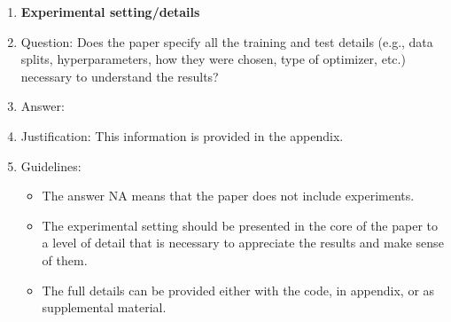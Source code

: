 \documentclass{article}
\theoremstyle{plain}
\theoremstyle{definition}
\theoremstyle{remark}
\begin{document}
\begin{enumerate}
\item {\bf Experimental setting/details}
    \item[] Question: Does the paper specify all the training and test details (e.g., data splits, hyperparameters, how they were chosen, type of optimizer, etc.) necessary to understand the results?
    \item[] Answer: \answerYes{} %
    \item[] Justification: This information is provided in the appendix.
    \item[] Guidelines:
    \begin{itemize}
        \item The answer NA means that the paper does not include experiments.
        \item The experimental setting should be presented in the core of the paper to a level of detail that is necessary to appreciate the results and make sense of them.
        \item The full details can be provided either with the code, in appendix, or as supplemental material.
    \end{itemize}


\end{enumerate}
\end{document}
